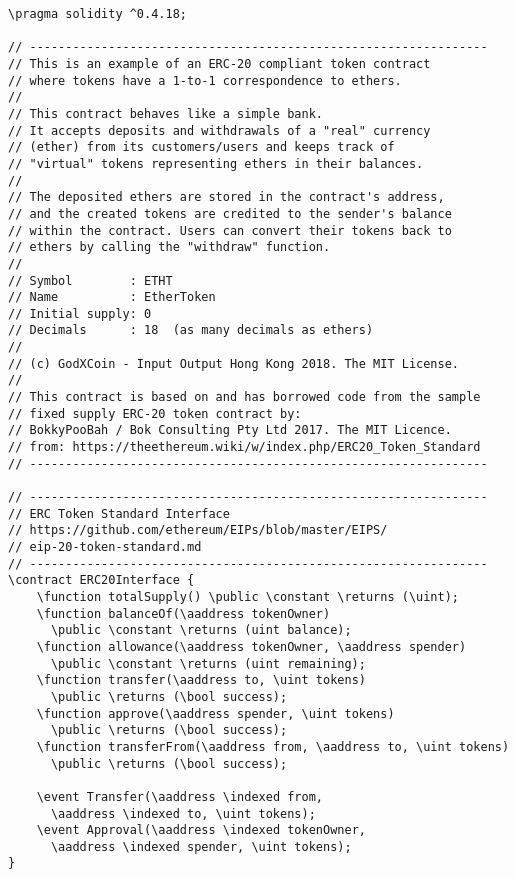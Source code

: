 \documentclass{llncs}
\newcommand{\red}[1]{\textcolor[rgb]{1,0,0}{#1}}
\newcommand{\blue}[1]{\textcolor[rgb]{0,0,1}{#1}}
\newcommand{\brown}[1]{\textcolor[rgb]{0.8,0.6,0.4}{#1}}
\newcommand{\verbsize}{\small}
\newcommand{\pragma}{\red{pragma}}
\newcommand{\contract}{\red{contract}}
\newcommand{\function}{\blue{function}}
\newcommand{\event}{\blue{event}}
\newcommand{\returns}{\blue{returns}}
\newcommand{\public}{\blue{public}}
\newcommand{\constant}{\blue{constant}}
\newcommand{\indexed}{\blue{indexed}}
\newcommand{\uint}{\brown{uint}}
\newcommand{\bool}{\brown{bool}}
\newcommand{\aaddress}{\brown{address}}
\begin{document}
\begin{small}
\begin{Verbatim}[commandchars=\\\?\?,fontsize=\verbsize]
\pragma solidity ^0.4.18;
 
// ----------------------------------------------------------------
// This is an example of an ERC-20 compliant token contract 
// where tokens have a 1-to-1 correspondence to ethers.
//
// This contract behaves like a simple bank. 
// It accepts deposits and withdrawals of a "real" currency 
// (ether) from its customers/users and keeps track of 
// "virtual" tokens representing ethers in their balances.
//
// The deposited ethers are stored in the contract's address, 
// and the created tokens are credited to the sender's balance 
// within the contract. Users can convert their tokens back to 
// ethers by calling the "withdraw" function.
//
// Symbol        : ETHT
// Name          : EtherToken
// Initial supply: 0
// Decimals      : 18  (as many decimals as ethers)
//
// (c) GodXCoin - Input Output Hong Kong 2018. The MIT License.
//
// This contract is based on and has borrowed code from the sample 
// fixed supply ERC-20 token contract by:
// BokkyPooBah / Bok Consulting Pty Ltd 2017. The MIT Licence.
// from: https://theethereum.wiki/w/index.php/ERC20_Token_Standard
// ----------------------------------------------------------------

// ----------------------------------------------------------------
// ERC Token Standard Interface
// https://github.com/ethereum/EIPs/blob/master/EIPS/
// eip-20-token-standard.md
// ----------------------------------------------------------------
\contract ERC20Interface {
    \function totalSupply() \public \constant \returns (\uint);
    \function balanceOf(\aaddress tokenOwner) 
      \public \constant \returns (uint balance);
    \function allowance(\aaddress tokenOwner, \aaddress spender) 
      \public \constant \returns (uint remaining);
    \function transfer(\aaddress to, \uint tokens) 
      \public \returns (\bool success);
    \function approve(\aaddress spender, \uint tokens) 
      \public \returns (\bool success);
    \function transferFrom(\aaddress from, \aaddress to, \uint tokens)
      \public \returns (\bool success);

    \event Transfer(\aaddress \indexed from, 
      \aaddress \indexed to, \uint tokens);
    \event Approval(\aaddress \indexed tokenOwner, 
      \aaddress \indexed spender, \uint tokens);
}


\end{Verbatim}
\end{small}
\end{document}
